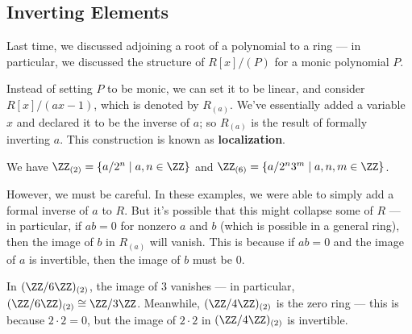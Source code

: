 

\subsection{Inverting Elements}

Last time, we discussed adjoining a root of a polynomial to a ring --- in particular, we discussed the structure of $R[x]/(P)$ for a monic polynomial $P$. 

Instead of setting $P$ to be monic, we can set it to be linear, and consider $R[x]/(ax - 1)$, which is denoted by $R_{(a)}$. We've essentially added a variable $x$ and declared it to be the inverse of $a$; so $R_{(a)}$ is the result of formally inverting $a$. This construction is known as \textbf{localization}. 



\begin{example}
We have $\ZZ_{(2)} = \left\{a/2^n \mid a, n \in \ZZ\right\}$ and $\ZZ_{(6)} = \left\{a/2^n3^m \mid a, n, m \in \ZZ\right\}$. 
\end{example}


However, we must be careful. In these examples, we were able to simply add a formal inverse of $a$ to $R$. But it's possible that this might collapse some of $R$ --- in particular, if $ab = 0$ for nonzero $a$ and $b$ (which is possible in a general ring), then the image of $b$ in $R_{(a)}$ will vanish. This is because if $ab = 0$ and the image of $a$ is invertible, then the image of $b$ must be $0$. 

\begin{example}
In $(\ZZ/6\ZZ)_{(2)}$, the image of $3$ vanishes --- in particular, $(\ZZ/6\ZZ)_{(2)} \cong \ZZ/3\ZZ$. Meanwhile, $(\ZZ/4\ZZ)_{(2)}$ is the zero ring --- this is because $2\cdot 2 = 0$, but the image of $2\cdot 2$ in $(\ZZ/4\ZZ)_{(2)}$ is invertible. 
\end{example}

